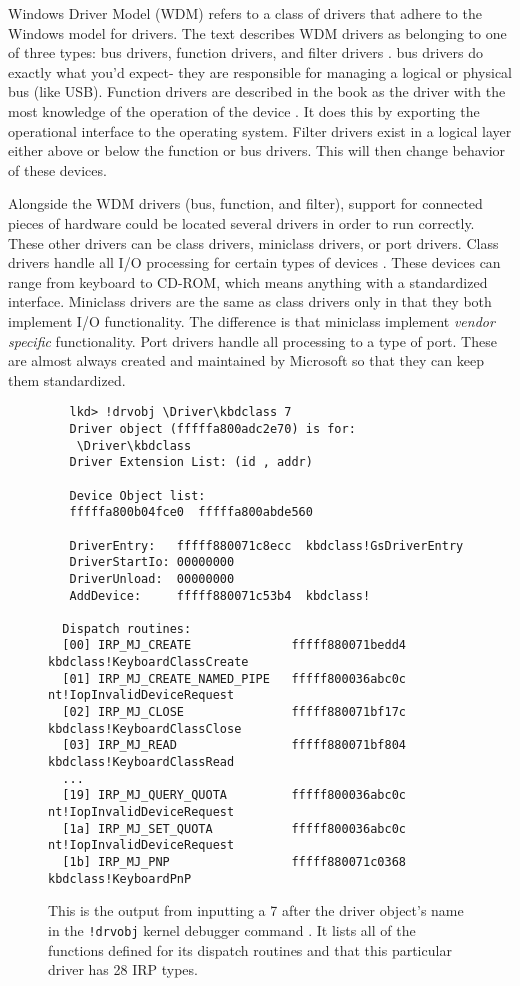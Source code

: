 \documentclass[10pt,draftclsnofoot,onecolumn]{IEEEtran}
\begin{document}
\par Windows Driver Model (WDM) refers to a class of drivers that adhere to the Windows model for drivers.
The text describes WDM drivers as belonging to one of three types: bus drivers, function drivers, and filter drivers \cite{win:2}.
bus drivers do exactly what you'd expect- they are responsible for managing a logical or physical bus (like USB).
Function drivers are described in the book as the driver with the most knowledge of the operation of the device \cite{win:2}.
It does this by exporting the operational interface to the operating system.
Filter drivers exist in a logical layer either above or below the function or bus drivers.
This will then change behavior of these devices.

\par Alongside the WDM drivers (bus, function, and filter), support for connected pieces of hardware could be located several drivers in order to run correctly.
These other drivers can be class drivers, miniclass drivers, or port drivers.
Class drivers handle all I/O processing for certain types of devices \cite{win:2}.
These devices can range from keyboard to CD-ROM, which means anything with a standardized interface.
Miniclass drivers are the same as class drivers only in that they both implement I/O functionality.
The difference is that miniclass implement \textit{vendor specific} functionality.
Port drivers handle all processing to a type of port.
These are almost always created and maintained by Microsoft so that they can keep them standardized.

\begin{figure}[h]
\begin{lstlisting}
   lkd> !drvobj \Driver\kbdclass 7
   Driver object (fffffa800adc2e70) is for:
    \Driver\kbdclass
   Driver Extension List: (id , addr)

   Device Object list:
   fffffa800b04fce0  fffffa800abde560

   DriverEntry:   fffff880071c8ecc  kbdclass!GsDriverEntry
   DriverStartIo: 00000000
   DriverUnload:  00000000
   AddDevice:     fffff880071c53b4  kbdclass!

  Dispatch routines:
  [00] IRP_MJ_CREATE              fffff880071bedd4  kbdclass!KeyboardClassCreate
  [01] IRP_MJ_CREATE_NAMED_PIPE   fffff800036abc0c  nt!IopInvalidDeviceRequest
  [02] IRP_MJ_CLOSE               fffff880071bf17c  kbdclass!KeyboardClassClose
  [03] IRP_MJ_READ                fffff880071bf804  kbdclass!KeyboardClassRead
  ...
  [19] IRP_MJ_QUERY_QUOTA         fffff800036abc0c  nt!IopInvalidDeviceRequest
  [1a] IRP_MJ_SET_QUOTA           fffff800036abc0c  nt!IopInvalidDeviceRequest
  [1b] IRP_MJ_PNP                 fffff880071c0368  kbdclass!KeyboardPnP
\end{lstlisting}
\centering
\captionsetup{justification=centering}
\caption{
  This is the output from inputting a 7 after the driver object's name in the \texttt{!drvobj} kernel debugger command \cite{win:2}.
  It lists all of the functions defined for its dispatch routines and that this particular driver has 28 IRP types.
}
\label{code:dispatch_routine}
\end{figure}
\end{document}
